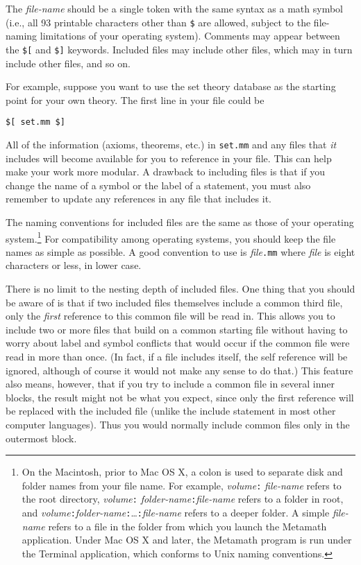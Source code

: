 The {\em file-name} should be a single token with the same syntax
as a math symbol (i.e., all 93 printable characters other than \texttt{\$} are
allowed, subject to the file-naming limitations of your operating system).
Comments may appear between the \texttt{\$[} and \texttt{\$]} keywords.  Included
files may include other files, which may in turn include other files, and so
on.

For example, suppose you want to use the set theory database as the starting
point for your own theory.  The first line in your file could be
\begin{center}
\texttt{\$[ set.mm \$]}
\end{center} All of the information (axioms, theorems,
etc.) in \texttt{set.mm} and any files that {\em it} includes will become
available for you to reference in your file. This can help make your work more
modular. A drawback to including files is that if you change the name of a
symbol or the label of a statement, you must also remember to update any
references in any file that includes it.


The naming conventions for included files are the same as those of your
operating system.\footnote{On the Macintosh, prior to Mac OS X,
 a colon is used to separate disk
and folder names from your file name.  For example, {\em volume}\texttt{:}{\em
file-name} refers to the root directory, {\em volume}\texttt{:}{\em
folder-name}\texttt{:}{\em file-name} refers to a folder in root, and {\em
volume}\texttt{:}{\em folder-name}\texttt{:}\ldots\texttt{:}{\em file-name} refers to a
deeper folder.  A simple {\em file-name} refers to a file in the folder from
which you launch the Metamath application.  Under Mac OS X and later,
the Metamath program is run under the Terminal application, which
conforms to Unix naming conventions.}\label{includef} For compatibility among
operating systems, you should keep the file names as simple as possible.  A
good convention to use is {\em file}\texttt{.mm} where {\em file} is eight
characters or less, in lower case.

There is no limit to the nesting depth of included files.  One thing that you
should be aware of is that if two included files themselves include a common
third file, only the {\em first} reference to this common file will be read
in.  This allows you to include two or more files that build on a common
starting file without having to worry about label and symbol conflicts that
would occur if the common file were read in more than once.  (In fact, if a
file includes itself, the self reference will be ignored, although of course
it would not make any sense to do that.)  This feature also means, however,
that if you try to include a common file in several inner blocks, the result
might not be what you expect, since only the first reference will be replaced
with the included file (unlike the include statement in most other computer
languages).  Thus you would normally include common files only in the
outermost block.

